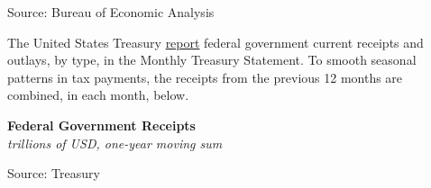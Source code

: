 \documentclass{report}
\makeatletter
\newcommand{\tbllink}[1]{\href{https://raw.githubusercontent.com/bdecon/US-chartbook/master/chartbook/data/#1}{\faTable}}
\newcommand*\short[1]{\expandafter\@gobbletwo\number\numexpr#1\relax}
\newcommand{\absnode}[3]{\node[below right, align=left] at (axis cs: #1,#2) {#3};}
\newcommand{\ltdateaxisticks}{
		date coordinates in=x, axis line style={draw=none},
		xmax={2023-11-30},
		max space between ticks=40,	    
		xtick={{2013-01-01}, {2014-01-01}, {2015-01-01}, {2016-01-01}, {2017-01-01}, {2018-01-01}, 
		    {2019-01-01}, {2020-01-01}, {2021-01-01}, {2022-01-01}, {2023-01-01}, {2024-01-01}},
		enlarge y limits={0.06}, enlarge x limits={0.01},
		xticklabel style={align=center, yshift=-2pt}, tick label style={inner sep=0pt},
		}
\newcommand{\bbar}[2]{extra #1 ticks = {{#2}}, extra #1 tick labels = ,
		extra #1 tick style = {grid=major, grid style={thick, black!25}},}
\newcommand{\stdline}[4]{\addplot[very thick, no markers, color=#1] 
		table [x=#2, y=#3, col sep=comma] {#4};	}
\newcommand{\rbar}{
		\fill[color=black!10] (axis cs:{2020-02-01},\pgfkeysvalueof{/pgfplots/ymin}) rectangle 
			(axis cs:{2020-05-01}, \pgfkeysvalueof{/pgfplots/ymax});}
\makeatother
\begin{document}
{\begin{minipage}{0.39\textwidth}
\footnotesize{Source: Bureau of Economic Analysis} \hfill \tbllink{fed_gov_rec_type.csv}
\end{minipage} \hspace{5mm} \begin{minipage}{0.33\textwidth}
\small 
\end{minipage}
\newpage
\begin{minipage}{0.76\textwidth}
\small The United States Treasury \href{https://fiscal.treasury.gov/reports-statements/mts/current.html}{report} federal government current receipts and outlays, by type, in the Monthly Treasury Statement. To smooth seasonal patterns in tax payments, the receipts from the previous 12 months are combined, in each month, below. 
\end{minipage}  

\begin{minipage}{0.43\textwidth}
\normalsize \textbf{Federal Government Receipts}\\
\footnotesize{\textit{trillions of USD, one-year moving sum}}
\vspace{3.2cm}

\hspace{2mm} 

\footnotesize{Source: Treasury} \hfill \tbllink{tmb_rec.csv} \ \ 
\end{minipage} \hspace{5mm}
\begin{minipage}{0.29\textwidth}
\small 
\end{minipage}
\vspace{4mm}

}
\end{document}
